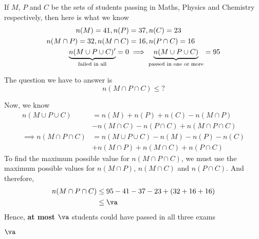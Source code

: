 \begin{solution}[\fullpage]
  If $M$, $P$ and $C$ be the sets of students passing in Maths, Physics and 
  Chemistry respectively, then here is what we know 
  \begin{align}
    n(M) = 41, n(P)&=37, n(C)=23 \\
    n(M\cap P) = 32, n(M\cap C) &= 16, n(P\cap C) = 16 \\
    \underbrace{n(M\cup P\cup C)'}_{\text{failed in all}} = 0 &\implies
    \underbrace{n(M\cup P\cup C)}_{\text{passed in one or more}} = 95
  \end{align}

  The question we have to answer is \[ n(M\cap P\cap C)\leq ?\]
  
  Now, we know
  \begin{align}
    n(M\cup P\cup C) &= n(M) + n(P) + n(C) - n(M\cap P) \nonumber \\
                     &- n(M\cap C) - n(P\cap C) + n(M\cap P\cap C) \\
    \implies n(M\cap P\cap C) &= n(M\cup P\cup C) - n(M) - n(P) - n(C) \nonumber \\
                              &+ n(M\cap P) + n(M\cap C) + n(P\cap C)
  \end{align}
  To find the maximum possible value for $n(M\cap P\cap C)$, we must use the maximum possible 
  values for $n(M\cap P)$, $n(M\cap C)$ and $n(P\cap C)$. And therefore, 
  \begin{align}
    n(M\cap P\cap C) &\leq \vt-\vm-\vp-\vc + (\vx + \vy + \vz) \\
                     &\leq \va
  \end{align}
  Hence, \textbf{at most} $\va$ students could have passed in all three exams
\end{solution}

\ifprintanswers
  \begin{codex}
    $\va$
  \end{codex}
\fi 

